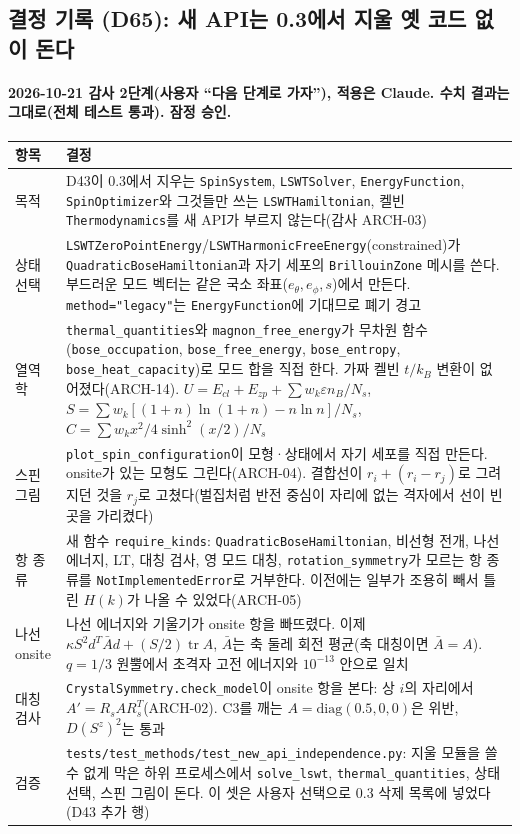 \subsection{결정 기록 (D65): 새 API는 0.3에서 지울 옛 코드 없이 돈다}\label{decisions-d65-new-api-independent}
\begingroup%
  \framesubtitle{2026-10-21 감사 2단계(사용자 ``다음 단계로 가자''), 적용은 Claude. 수치 결과는 그대로(전체 테스트 통과). 잠정 승인.}
  \small\renewcommand{\arraystretch}{1.12}
  \begin{tabularx}{\textwidth}{@{}P{3.0cm}Y@{}}
    \toprule
    항목 & 결정 \\
    \midrule
    목적 & D43이 0.3에서 지우는 \texttt{SpinSystem}, \texttt{LSWTSolver}, \texttt{EnergyFunction}, \texttt{SpinOptimizer}와 그것들만 쓰는 \texttt{LSWTHamiltonian}, 켈빈 \texttt{Thermodynamics}를 새 API가 부르지 않는다(감사 ARCH-03) \\
    상태 선택 & \texttt{LSWTZeroPointEnergy}/\texttt{LSWTHarmonicFreeEnergy}(constrained)가 \texttt{QuadraticBoseHamiltonian}과 자기 세포의 \texttt{BrillouinZone} 메시를 쓴다. 부드러운 모드 벡터는 같은 국소 좌표($e_\theta,e_\phi,s$)에서 만든다. \texttt{method="legacy"}는 \texttt{EnergyFunction}에 기대므로 폐기 경고 \\
    열역학 & \texttt{thermal\_quantities}와 \texttt{magnon\_free\_energy}가 무차원 함수(\texttt{bose\_occupation}, \texttt{bose\_free\_energy}, \texttt{bose\_entropy}, \texttt{bose\_heat\_capacity})로 모드 합을 직접 한다. 가짜 켈빈 $t/k_B$ 변환이 없어졌다(ARCH-14). $U=E_{cl}+E_{zp}+\sum w_k\varepsilon n_B/N_s$, $S=\sum w_k[(1+n)\ln(1+n)-n\ln n]/N_s$, $C=\sum w_k x^2/4\sinh^2(x/2)/N_s$ \\
    스핀 그림 & \texttt{plot\_spin\_configuration}이 모형·상태에서 자기 세포를 직접 만든다. onsite가 있는 모형도 그린다(ARCH-04). 결합선이 $r_i+(r_i-r_j)$로 그려지던 것을 $r_j$로 고쳤다(벌집처럼 반전 중심이 자리에 없는 격자에서 선이 빈 곳을 가리켰다) \\
    항 종류 & 새 함수 \texttt{require\_kinds}: \texttt{QuadraticBoseHamiltonian}, 비선형 전개, 나선 에너지, LT, 대칭 검사, 영 모드 대칭, \texttt{rotation\_symmetry}가 모르는 항 종류를 \texttt{NotImplementedError}로 거부한다. 이전에는 일부가 조용히 빼서 틀린 $H(k)$가 나올 수 있었다(ARCH-05) \\
    나선 onsite & 나선 에너지와 기울기가 onsite 항을 빠뜨렸다. 이제 $\kappa S^2 d^T\bar A d+(S/2)\operatorname{tr}A$, $\bar A$는 축 둘레 회전 평균(축 대칭이면 $\bar A=A$). $q=1/3$ 원뿔에서 초격자 고전 에너지와 $10^{-13}$ 안으로 일치 \\
    대칭 검사 & \texttt{CrystalSymmetry.check\_model}이 onsite 항을 본다: 상 $i$의 자리에서 $A'=R_sAR_s^T$(ARCH-02). C3를 깨는 $A=\mathrm{diag}(0.5,0,0)$은 위반, $D(S^z)^2$는 통과 \\
    검증 & \texttt{tests/test\_methods/test\_new\_api\_independence.py}: 지울 모듈을 쓸 수 없게 막은 하위 프로세스에서 \texttt{solve\_lswt}, \texttt{thermal\_quantities}, 상태 선택, 스핀 그림이 돈다. 이 셋은 사용자 선택으로 0.3 삭제 목록에 넣었다(D43 추가 행) \\
    \bottomrule
  \end{tabularx}
\endgroup

